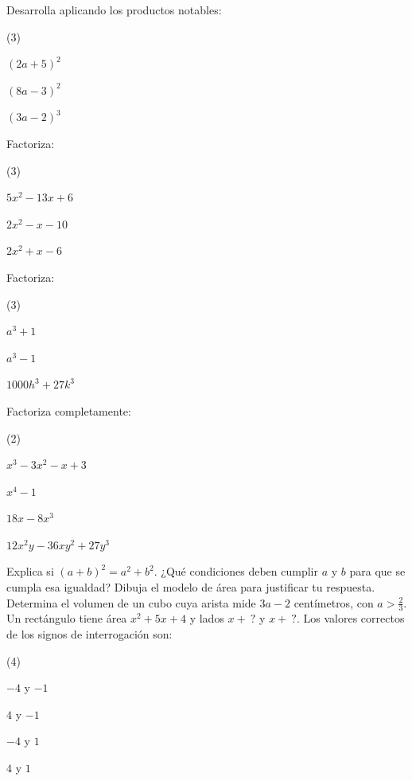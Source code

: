 \documentclass[11pt]{article}
\begin{document}
\begin{preguntas}
\pregunta Desarrolla aplicando los productos notables:
\begin{opciones*}(3)
  \item $(2a + 5)^2$
  \item $(8a - 3)^2$
  \item $(3a - 2)^3$
\end{opciones*}
\espacio{3cm}
\pregunta Factoriza:
\begin{opciones*}(3)
  \item $5x^2 - 13x + 6$
  \item $2x^2 - x - 10$
  \item $2x^2 + x - 6$
\end{opciones*}
\espacio{3cm}
\pregunta Factoriza:
\begin{opciones*}(3)
  \item $a^3 + 1$
  \item $a^3 - 1$
  \item $1000h^3 + 27k^3$
\end{opciones*}
\espacio{3cm}
\pregunta Factoriza completamente:
\begin{opciones*}(2)
  \item $x^3 - 3x^2 - x + 3$
  \item $x^4 - 1$
  \item $18x - 8x^3$
  \item $12x^2y - 36xy^2 + 27y^3$
\end{opciones*}
\espacio{3cm}
\pregunta Explica si $(a + b)^2 = a^2 + b^2$. ¿Qué condiciones deben cumplir
$a$ y $b$ para que se cumpla esa igualdad? Dibuja el modelo de área para
justificar tu respuesta.
\espacio{3cm}
\pregunta Determina el volumen de un cubo cuya arista mide $3a - 2$
centímetros, con $a > \frac{2}{3}$.
\espacio{2cm}
\pregunta Un rectángulo tiene área $x^2 + 5x + 4$ y lados $x + \ ?$ y
$x + \ ?$. Los valores correctos de los signos de interrogación son:
\begin{opciones*}(4)
  \item $-4$ y $-1$
  \item $4$ y $-1$
  \item $-4$ y $1$
  \item $4$ y $1$
\end{opciones*}
\end{preguntas}
\end{document}
